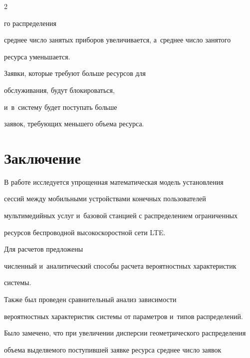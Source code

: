  \begin{multicols}{2}



\noindent

го распределения 

среднее число занятых приборов увеличивается, а~среднее число занятого 

ресурса уменьшается. 



Заявки, которые требуют больше ресурсов для 

обслуживания, будут блокироваться, 

и~в~систему будет поступать больше 

заявок, требующих меньшего объема ресурса.



\columnbreak




  



  

\section{Заключение}





    

  В работе исследуется упрощенная математи\-ческая модель установления 

сессий между мо\-биль\-ными устройствами конечных пользователей 

мультимедий\-ных услуг и~базовой станцией с распределением ограниченных 

ресурсов беспроводной высокоскоростной сети LTE. 

%

Для расчетов предложены 

численный и~аналитический способы расчета вероятностных характеристик 

системы. 



Также был проведен сравнительный анализ зависимости 

вероятностных характеристик системы от параметров и~типов распределений. 



Было замечено, что при увеличении дисперсии геометрического распределения 

объема выделя\-емо\-го поступившей заявке ресурса среднее чис\-ло заявок 


\end{multicols}
